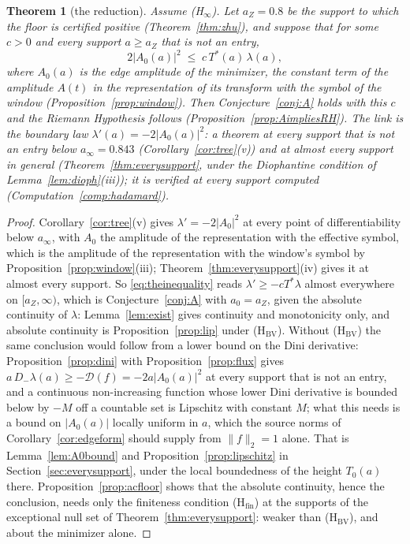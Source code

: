\documentclass[11pt]{article}
\newtheorem{theorem}{Theorem}[section]
\theoremstyle{definition}
\theoremstyle{remark}
\newcommand{\Tst}{T^{*}}
\newcommand{\Dm}{D_{-}}
\begin{document}
\begin{theorem}[the reduction]\label{thm:reduction}
Assume (H$_\infty$). Let $a_Z=0.8$ be the support to which the floor is certified positive (Theorem~\ref{thm:zhu}), and suppose that for some $c>0$ and every support $a\ge a_Z$ that is not an entry,
\begin{equation}\label{eq:theinequality}
2|A_0(a)|^2\;\le\;c\,\Tst(a)\,\lambda(a),
\end{equation}
where $A_0(a)$ is the edge amplitude of the minimizer, the constant term of the amplitude $A(t)$ in the representation of its transform with the symbol of the window (Proposition~\ref{prop:window}). Then Conjecture~\ref{conj:A} holds with this $c$ and the Riemann Hypothesis follows (Proposition~\ref{prop:AimpliesRH}). The link is the boundary law $\lambda'(a)=-2|A_0(a)|^2$: a theorem at every support that is not an entry below $a_\infty=0.843$ (Corollary~\ref{cor:tree}(v)) and at almost every support in general (Theorem~\ref{thm:everysupport}, under the Diophantine condition of Lemma~\ref{lem:dioph}(iii)); it is verified at every support computed (Computation~\ref{comp:hadamard}).
\end{theorem}
\begin{proof}
Corollary~\ref{cor:tree}(v) gives $\lambda'=-2|A_0|^2$ at every point of differentiability below $a_\infty$, with $A_0$ the amplitude of the representation with the effective symbol, which is the amplitude of the representation with the window's symbol by Proposition~\ref{prop:window}(iii); Theorem~\ref{thm:everysupport}(iv) gives it at almost every support. So \eqref{eq:theinequality} reads $\lambda'\ge-c\Tst\lambda$ almost everywhere on $[a_Z,\infty)$, which is Conjecture~\ref{conj:A} with $a_0=a_Z$, given the absolute continuity of $\lambda$: Lemma~\ref{lem:exist} gives continuity and monotonicity only, and absolute continuity is Proposition~\ref{prop:lip} under (H$_{\mathrm{BV}}$). Without (H$_{\mathrm{BV}}$) the same conclusion would follow from a lower bound on the Dini derivative: Proposition~\ref{prop:dini} with Proposition~\ref{prop:flux} gives $a\,\Dm\lambda(a)\ge-\mathcal D(f)=-2a|A_0(a)|^2$ at every support that is not an entry, and a continuous non-increasing function whose lower Dini derivative is bounded below by $-M$ off a countable set is Lipschitz with constant $M$; what this needs is a bound on $|A_0(a)|$ locally uniform in $a$, which the source norms of Corollary~\ref{cor:edgeform} should supply from $\|f\|_2=1$ alone. That is Lemma~\ref{lem:A0bound} and Proposition~\ref{prop:lipschitz} in Section~\ref{sec:everysupport}, under the local boundedness of the height $T_0(a)$ there. Proposition~\ref{prop:acfloor} shows that the absolute continuity, hence the conclusion, needs only the finiteness condition (H$_{\mathrm{fin}}$) at the supports of the exceptional null set of Theorem~\ref{thm:everysupport}: weaker than (H$_{\mathrm{BV}}$), and about the minimizer alone.
\end{proof}
\end{document}
